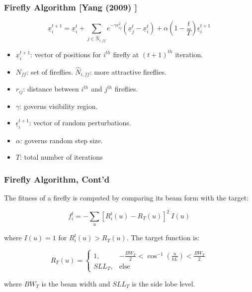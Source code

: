 \documentclass[...]{beamer}
\begin{document}
\begin{frame}
  \frametitle{Firefly Algorithm [Yang (2009) \cite{Yang2009}]}

  \begin{equation*}
    \underline{x}_i^{t+1} = \underline{x}_i^t + \sum\limits_{j \in \hat{N}_{i,f\!f}}e^{-\gamma r_{ij}^2}\left(\underline{x}_j^t - \underline{x}_i^t\right) + \alpha \left(1-\frac{t}{T}\right)\underline{\epsilon}_i^{t+1}
  \end{equation*}

  \begin{itemize}
    \item $\underline{x}_i^{t+1}$: vector of positions for $i^{th}$ firefly at $(t+1)^{th}$ iteration.
    \item $N_{f\!f}$: set of fireflies. $\hat{N}_{i,f\!f}$: more attractive fireflies.
    \item $r_{ij}$: distance between $i^{th}$ and $j^{th}$ fireflies.
    \item $\gamma$: governs visibility region.
    \item $\underline{\epsilon}_i^{t+1}$: vector of random perturbations.
    \item $\alpha$: governs random step size.
    \item $T$: total number of iterations
  \end{itemize}

\end{frame}

\begin{frame}
  \frametitle{Firefly Algorithm, Cont'd}

  The fitness of a firefly is computed by comparing its beam form with the target:

  \begin{equation*}
    f_i^t = -\sum_u\left[R_i^t(u) - R_T(u)\right]^2 ~ I(u)
  \end{equation*}

  where  $I(u) = 1$ for $R_i^t(u) > R_T(u)$.  The target function is:

  \begin{equation*}
    R_T(u) = 
    \begin{cases}
      1,& -\frac{BW_T}{2} < \cos^{-1}\left(\frac{u}{kL}\right) < \frac{BW_T}{2}\\
      SLL_T,& \text{else}
    \end{cases}
  \end{equation*}

  where $BW_T$ is the beam width and $SLL_T$ is the side lobe level.

\end{frame}
\end{document}
